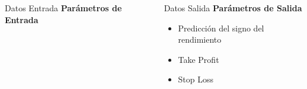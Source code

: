 \documentclass[final, xcolor=table]{beamer}\usepackage[]{graphicx}\usepackage[]{color}
\begin{document}
\begin{frame}
\begin{columns}[t]
\begin{column}{.32 \linewidth}
\begin{block}{\small Datos Entrada}
\small
\textbf{Par\'ametros de Entrada}


\end{block}
\end{column}


\begin{column}{.32 \linewidth}
\begin{block}{\small Datos Salida}
\small
\textbf{Par\'ametros de Salida}

\begin{itemize}
  \item Predicci\'on del signo del rendimiento
  \item Take Profit
  \item Stop Loss
\end{itemize}

\end{block}
\end{column}

\end{columns}


\begin{columns}[t]



\end{columns}
\end{frame}
\end{document}
